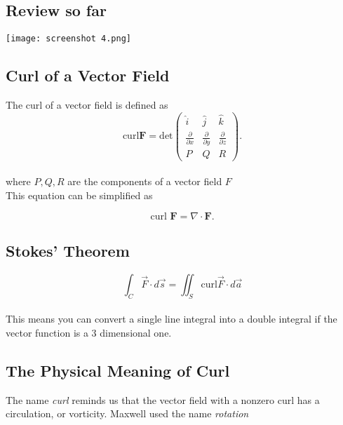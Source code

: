 \documentclass[svgnames]{article}
\begin{document}
\subsection{Review so far} 
\vspace{20px}
\begin{center}
  \texttt{[image: screenshot 4.png]}
\end{center}

\vspace{20px}

\subsection{Curl of a Vector Field}

The curl of a vector field is defined as \[
  \text{curl} \textbf{F} = \text{det} \begin{pmatrix}
    \hat{i} & \hat{j} & \hat{k} \\
    \frac{\partial}{\partial x} & \frac{\partial}{\partial y}
                                & \frac{\partial}{\partial z} \\
    P & Q & R 
  \end{pmatrix}
.\] \\
where $P, Q, R$ are the components of a vector field $F$ \\

This equation can be simplified as 

\[
  \text{curl } \textbf{F} = \nabla \cdot \textbf{F}   
.\] 


\subsection{Stokes' Theorem}

\[ \int_C \vec{F} \cdot d\vec{s} = \iint_S \text{curl} \vec{F} \cdot d\vec{a}
\] \\

This means you can convert a single line integral into a double integral if the
vector function is a 3 dimensional one. 

\subsection{The Physical Meaning of Curl}


The name \textit{curl} reminds us that the vector field with a nonzero curl
has a circulation, or vorticity. Maxwell used the name \textit{rotation}\\
\end{document}
